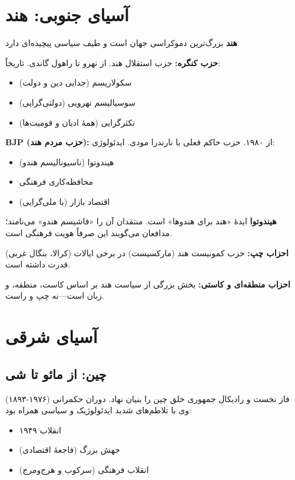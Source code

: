 \section{آسیای جنوبی: هند}


\textbf{هند} بزرگ‌ترین دموکراسی جهان است و طیف سیاسی پیچیده‌ای دارد.

\textbf{حزب کنگره:}
حزب استقلال هند. از نهرو تا راهول گاندی. تاریخاً:
\begin{itemize}
    \item سکولاریسم (جدایی دین و دولت)
    \item سوسیالیسم نهرویی (دولتی‌گرایی)
    \item تکثرگرایی (همهٔ ادیان و قومیت‌ها)
\end{itemize}

\textbf{BJP (حزب مردم هند):}
از ۱۹۸۰. حزب حاکم فعلی با نارندرا مودی. ایدئولوژی:
\begin{itemize}
    \item هیندوتوا (ناسیونالیسم هندو)
    \item محافظه‌کاری فرهنگی
    \item اقتصاد بازار (با ملی‌گرایی)
\end{itemize}

\textbf{هیندوتوا} ایدهٔ «هند برای هندوها» است. منتقدان آن را «فاشیسم هندو» می‌نامند؛ مدافعان می‌گویند این صرفاً هویت فرهنگی است.

\textbf{احزاب چپ:}
حزب کمونیست هند (مارکسیست) در برخی ایالات (کرالا، بنگال غربی) قدرت داشته است.

\textbf{احزاب منطقه‌ای و کاستی:}
بخش بزرگی از سیاست هند بر اساس کاست، منطقه، و زبان است—نه چپ و راست.


\section{آسیای شرقی}

\subsection{چین: از مائو تا شی}


 (۱۸۹۳-۱۹۷۶) فاز نخست و رادیکال جمهوری خلق چین را بنیان نهاد. دوران حکمرانی وی با تلاطم‌های شدید ایدئولوژیک و سیاسی همراه بود:
\begin{itemize}
    \item انقلاب ۱۹۴۹
    \item جهش بزرگ (فاجعهٔ اقتصادی)
    \item انقلاب فرهنگی (سرکوب و هرج‌ومرج)
\end{itemize}


